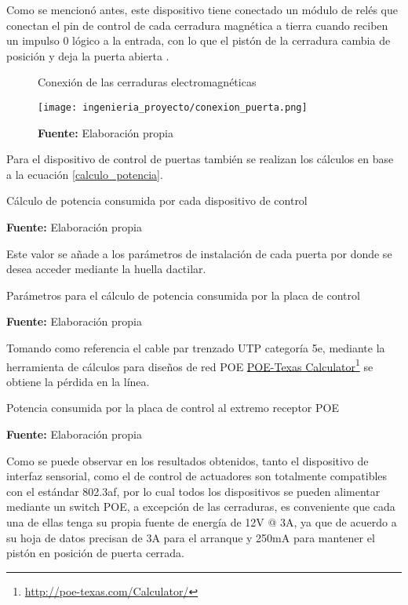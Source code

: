 \documentclass[../principal]{subfiles}
\begin{document}
  Como se mencionó antes, este dispositivo tiene conectado un módulo de relés que conectan el pin de control de cada cerradura magnética a tierra cuando reciben un impulso 0 lógico a la entrada, con lo que el pistón de la cerradura cambia de posición y deja la puerta abierta \cite{datasheet:chapa_tesa}.

  \begin{figure}[H]
    \centering
    \caption{Conexión de las cerraduras electromagnéticas}
    \texttt{[image: ingenieria\_proyecto/conexion\_puerta.png]}
    \caption*{\textbf{Fuente:} Elaboración propia}
    \label{fig:conexion_puerta}
  \end{figure}

  Para el dispositivo de control de puertas también se realizan los cálculos en base a la ecuación \ref{calculo_potencia}.

  \begin{table}[H]
    \centering
    \caption{Cálculo de potencia consumida por cada dispositivo de control}
    
    \caption*{\textbf{Fuente:} Elaboración propia}
  \end{table}

  Este valor se añade a los parámetros de instalación de cada puerta por donde se desea acceder mediante la huella dactilar.

  \begin{table}[H]
    \centering
    \caption{Parámetros para el cálculo de potencia consumida por la placa de control}
    
    \caption*{\textbf{Fuente:} Elaboración propia}
  \end{table}

  Tomando como referencia el cable par trenzado UTP categoría 5e, mediante la herramienta de cálculos para diseños de red POE \href{http://poe-texas.com/Calculator/}{POE-Texas Calculator}\footnote{\href{http://poe-texas.com/Calculator/}{http://poe-texas.com/Calculator/}} se obtiene la pérdida en la línea.

  \begin{table}[H]
    \caption{Potencia consumida por la placa de control al extremo receptor POE}
    \centering
    
    \caption*{\textbf{Fuente:} Elaboración propia}
  \end{table}

  Como se puede observar en los resultados obtenidos, tanto el dispositivo de interfaz sensorial, como el de control de actuadores son totalmente compatibles con el estándar 802.3af, por lo cual todos los dispositivos se pueden alimentar mediante un switch POE, a excepción de las cerraduras, es conveniente que cada una de ellas tenga su propia fuente de energía de 12V @ 3A, ya que de acuerdo a su hoja de datos \cite{datasheet:chapa_tesa} precisan de 3A para el arranque y 250mA para mantener el pistón en posición de puerta cerrada.
\end{document}
